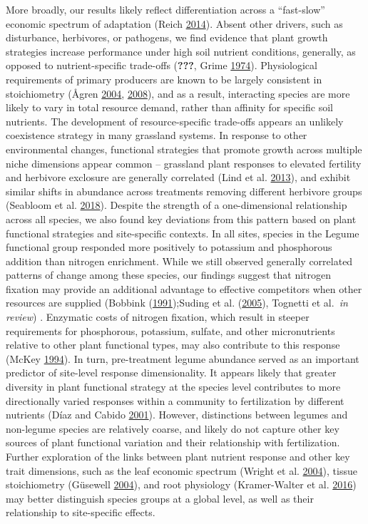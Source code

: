 \documentclass[twoside,12pt,final]{ucthesis-CA2012}
\begin{document}
\begin{ucmainmatter}
More broadly, our results likely reflect differentiation across a ``fast-slow'' economic spectrum of adaptation (Reich \protect\hyperlink{ref-Reich2014}{2014}). Absent other drivers, such as disturbance, herbivores, or pathogens, we find evidence that plant growth strategies increase performance under high soil nutrient conditions, generally, as opposed to nutrient-specific trade-offs ({\textbf{???}}, Grime \protect\hyperlink{ref-Grime1974}{1974}). Physiological requirements of primary producers are known to be largely consistent in stoichiometry (Ågren \protect\hyperlink{ref-Agren2004}{2004}, \protect\hyperlink{ref-Agren2008}{2008}), and as a result, interacting species are more likely to vary in total resource demand, rather than affinity for specific soil nutrients. The development of resource-specific trade-offs appears an unlikely coexistence strategy in many grassland systems. In response to other environmental changes, functional strategies that promote growth across multiple niche dimensions appear common -- grassland plant responses to elevated fertility and herbivore exclosure are generally correlated (Lind et al. \protect\hyperlink{ref-Lind2013}{2013}), and exhibit similar shifts in abundance across treatments removing different herbivore groups (Seabloom et al. \protect\hyperlink{ref-Seabloom2018}{2018}).
Despite the strength of a one-dimensional relationship across all species, we also found key deviations from this pattern based on plant functional strategies and site-specific contexts. In all sites, species in the Legume functional group responded more positively to potassium and phosphorous addition than nitrogen enrichment. While we still observed generally correlated patterns of change among these species, our findings suggest that nitrogen fixation may provide an additional advantage to effective competitors when other resources are supplied (Bobbink (\protect\hyperlink{ref-Bobbink1991}{1991});Suding et al. (\protect\hyperlink{ref-Suding2005}{2005}), Tognetti et al.~\emph{in review}) . Enzymatic costs of nitrogen fixation, which result in steeper requirements for phosphorous, potassium, sulfate, and other micronutrients relative to other plant functional types, may also contribute to this response (McKey \protect\hyperlink{ref-McKey1994}{1994}).
In turn, pre-treatment legume abundance served as an important predictor of site-level response dimensionality. It appears likely that greater diversity in plant functional strategy at the species level contributes to more directionally varied responses within a community to fertilization by different nutrients (Díaz and Cabido \protect\hyperlink{ref-Diaz2001}{2001}). However, distinctions between legumes and non-legume species are relatively coarse, and likely do not capture other key sources of plant functional variation and their relationship with fertilization. Further exploration of the links between plant nutrient response and other key trait dimensions, such as the leaf economic spectrum (Wright et al. \protect\hyperlink{ref-Wright2004}{2004}), tissue stoichiometry (Güsewell \protect\hyperlink{ref-Gusewell2004}{2004}), and root physiology (Kramer-Walter et al. \protect\hyperlink{ref-Kramer-Walter2016}{2016}) may better distinguish species groups at a global level, as well as their relationship to site-specific effects.

\end{ucmainmatter}
\end{document}
